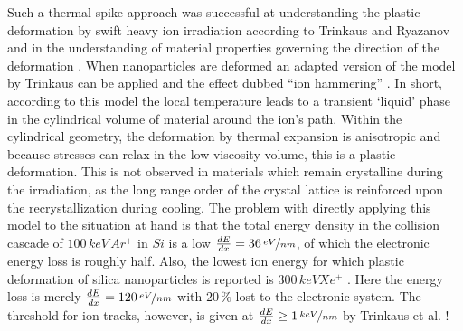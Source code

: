 Such a thermal spike approach was successful at understanding the plastic deformation by swift heavy ion irradiation according to Trinkaus and Ryazanov \cite{trinkaus_viscoelastic_1995} and in the understanding of material properties governing the direction of the deformation \cite{hedler_amorphous_2004,hedler_boundary_2005}. When nanoparticles are deformed \cite{snoeks_colloidal_2000,snoeks_colloidal_2001,van_dillen_anisotropic_2001,dillen_energy-dependent_2001,dillen_ion_2003,dillen_ion_2004} an adapted version of the model by Trinkaus can be applied and the effect dubbed ``ion hammering'' \cite{klaumunzer_ion_2004}. In short, according to this model the local temperature leads to a transient `liquid' phase in the cylindrical volume of material around the ion's path. Within the cylindrical geometry, the deformation by thermal expansion is anisotropic and because stresses can relax in the low viscosity volume, this is a plastic deformation. This is not observed in materials which remain crystalline during the irradiation, as the long range order of the crystal lattice is reinforced upon the recrystallization during cooling. The problem with directly applying this model to the situation at hand is that the total energy density in the collision cascade of $100\,keV\,Ar^+$ in $Si$ is a low $\frac{dE}{dx} = 36\,\nicefrac{eV}{nm}$, of which the electronic energy loss is roughly half. Also, the lowest ion energy for which plastic deformation of silica nanoparticles is reported is $300\,keV Xe^+$ \cite{dillen_ion_2003}. Here the energy loss is merely $\frac{dE}{dx} = 120\,\nicefrac{eV}{nm}$ with $20\,\%$ lost to the electronic system. The threshold for ion tracks, however, is given at $\frac{dE}{dx} \geq 1\,\nicefrac{keV}{nm}$ by Trinkaus et al. \cite{trinkaus_viscoelastic_1995}!

